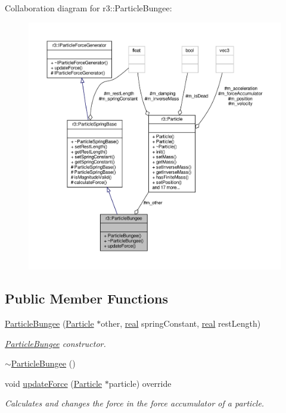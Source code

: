Collaboration diagram for r3\+:\+:Particle\+Bungee\+:\nopagebreak
\begin{figure}[H]
\begin{center}
\leavevmode
\includegraphics[width=350pt]{classr3_1_1_particle_bungee__coll__graph}
\end{center}
\end{figure}
\subsection*{Public Member Functions}
\begin{DoxyCompactItemize}
\item 
\mbox{\hyperlink{classr3_1_1_particle_bungee_aab8cdf8541433de21bc3d31db0434b6e}{Particle\+Bungee}} (\mbox{\hyperlink{classr3_1_1_particle}{Particle}} $\ast$other, \mbox{\hyperlink{namespacer3_ab2016b3e3f743fb735afce242f0dc1eb}{real}} spring\+Constant, \mbox{\hyperlink{namespacer3_ab2016b3e3f743fb735afce242f0dc1eb}{real}} rest\+Length)
\begin{DoxyCompactList}\small\item\em \mbox{\hyperlink{classr3_1_1_particle_bungee}{Particle\+Bungee}} constructor. \end{DoxyCompactList}\item 
\mbox{\hyperlink{classr3_1_1_particle_bungee_a54b12a4381fdcaeaba38a743c96b2bdc}{$\sim$\+Particle\+Bungee}} ()
\item 
void \mbox{\hyperlink{classr3_1_1_particle_bungee_a416f7100f9d859b0152ef6f8e551c2c1}{update\+Force}} (\mbox{\hyperlink{classr3_1_1_particle}{Particle}} $\ast$particle) override
\begin{DoxyCompactList}\small\item\em Calculates and changes the force in the force accumulator of a particle. \end{DoxyCompactList}\end{DoxyCompactItemize}
